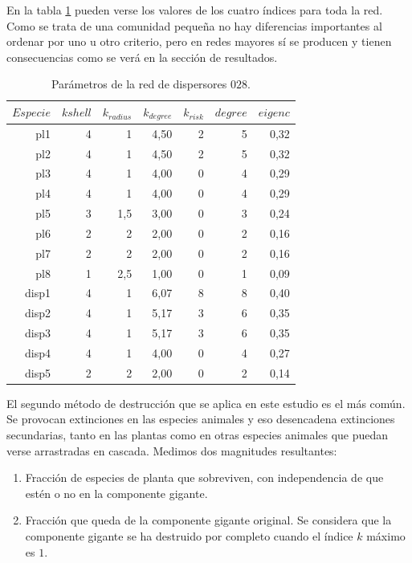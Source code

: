 En la tabla \ref{tab:pars_SD_028} pueden verse los valores de los cuatro índices para toda la red. Como se trata de una comunidad pequeña no hay diferencias importantes
al ordenar por uno u otro criterio, pero en redes mayores sí se producen y tienen consecuencias como se verá en la sección de resultados.


\begin{table}[htbp]
  \centering
  \small
    \begin{tabular}{rrrrrrr}
    \toprule
    $Especie$ & $k shell$ & ${k}_{radius}$ & ${k}_{degree}$ & ${k}_{risk}$ & $degree$ & $eigenc$ \\
\midrule
    pl1  & 4    & 1    & 4,50 & 2    & 5    & 0,32 \\
    pl2  & 4    & 1    & 4,50 & 2    & 5    & 0,32 \\
    pl3  & 4    & 1    & 4,00 & 0    & 4    & 0,29 \\
    pl4  & 4    & 1    & 4,00 & 0    & 4    & 0,29 \\
    pl5  & 3    & 1,5  & 3,00 & 0    & 3    & 0,24 \\
    pl6  & 2    & 2    & 2,00 & 0    & 2    & 0,16 \\
    pl7  & 2    & 2    & 2,00 & 0    & 2    & 0,16 \\
    pl8  & 1    & 2,5  & 1,00 & 0    & 1    & 0,09 \\
    disp1 & 4    & 1    & 6,07 & 8    & 8    & 0,40 \\
    disp2 & 4    & 1    & 5,17 & 3    & 6    & 0,35 \\
    disp3 & 4    & 1    & 5,17 & 3    & 6    & 0,35 \\
    disp4 & 4    & 1    & 4,00 & 0    & 4    & 0,27 \\
    disp5 & 2    & 2    & 2,00 & 0    & 2    & 0,14 \\
    \bottomrule
    \end{tabular}%
    \caption{Parámetros de la red de dispersores $028$.}
  \label{tab:pars_SD_028}%
\end{table}%

El segundo método de destrucción que se aplica en este estudio es el más común. Se provocan extinciones en las especies animales y eso desencadena extinciones secundarias, tanto
en las plantas como en otras especies animales que puedan verse arrastradas en cascada. Medimos dos magnitudes resultantes:

\begin{enumerate}
\item Fracción de especies de planta que sobreviven, con independencia de que estén o no en la componente gigante.
\item Fracción que queda de la componente gigante original. Se considera que la componente gigante se ha destruido por completo cuando el índice $k$ máximo es $1$.
\end{enumerate}

